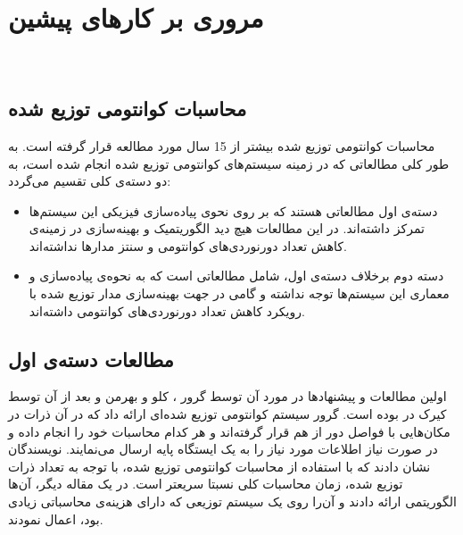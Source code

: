 \chapter{مروری بر کارهای پیشین}
\newpage
‎\renewcommand{\baselinestretch}{2}\normalsize‎
\label{relatedworks}

\section{محاسبات کوانتومی توزیع شده}


محاسبات کوانتومی توزیع شده بیشتر از 15 سال مورد مطالعه قرار گرفته است\cite{ying2009algebraic}. به طور کلی مطالعاتی که در زمینه سیستم‌های کوانتومی توزیع شده انجام شده است، به دو دسته‌ی کلی تقسیم می‌گردد:
\begin{itemize}
\item
دسته‌ی اول مطالعاتی هستند که بر روی نحوی پیاده‌سازی فیزیکی این سیستم‌ها تمرکز داشته‌اند. در این مطالعات هیچ دید الگوریتمیک و بهینه‌سازی در زمینه‌ی کاهش تعداد دورنوردی‌های کوانتومی و سنتز مدارها نداشته‌اند.
\item
دسته دوم برخلاف دسته‌ی اول، شامل مطالعاتی است که به نحوه‌ی پیاده‌سازی و معماری این سیستم‌ها توجه نداشته و گامی در جهت بهینه‌سازی مدار توزیع شده با رویکرد کاهش تعداد دورنوردی‌های کوانتومی داشته‌اند. 
\end{itemize}
\section{ مطالعات دسته‌ی اول}
اولین مطالعات و پیشنهادها در مورد آن توسط گرور \cite{grover1997quantum}، کلو و بهرمن \cite{cleve1997substituting} و بعد از آن توسط کیرک در\cite{Cirac1999} بوده است. 
گرور\cite{grover1997quantum} سیستم کوانتومی توزیع شده‌ای ارائه داد که در آن ذرات در مکان‌هایی با فواصل دور از هم قرار گرفته‌اند و هر کدام  محاسبات خود را انجام داده و در صورت نیاز اطلاعات مورد نیاز را به یک ایستگاه پایه ارسال می‌نمایند. نویسندگان نشان دادند که با استفاده از محاسبات کوانتومی توزیع شده، با توجه به تعداد ذرات توزیع شده، زمان محاسبات کلی نسبتا سریعتر است. در یک مقاله دیگر، آن‌ها الگوریتمی ارائه دادند و آن‌را روی یک سیستم توزیعی که دارای هزینه‌ی محاسباتی زیادی بود، اعمال نمودند.



